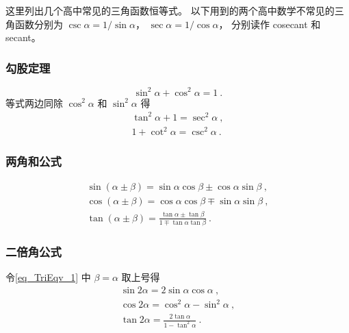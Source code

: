

这里列出几个高中常见的三角函数恒等式。 以下用到的两个高中数学不常见的三角函数分别为 $\csc \alpha= 1/\sin \alpha$， $\sec \alpha = 1/\cos \alpha$， 分别读作 cosecant 和 secant。

\subsubsection{勾股定理}
\begin{equation}
\sin^2 \alpha + \cos^2 \alpha = 1~.
\end{equation}
等式两边同除 $\cos^2 \alpha$ 和 $\sin^2 \alpha$ 得
\begin{gather}
\label{eq_TriEqv_13}
\tan^2 \alpha + 1 = \sec^2 \alpha~,\\
1 + \cot^2\alpha = \csc^2\alpha~.
\end{gather}

\subsubsection{两角和公式}
\begin{gather}\label{eq_TriEqv_1}
\sin(\alpha\pm \beta) = \sin \alpha\cos \beta \pm \cos \alpha\sin \beta~,\\
\label{eq_TriEqv_2}
\cos(\alpha\pm \beta) = \cos \alpha\cos \beta \mp \sin \alpha\sin \beta~,\\
\tan(\alpha\pm \beta) = \frac{\tan \alpha \pm \tan \beta}{1 \mp \tan \alpha \tan \beta}~.
\end{gather}

\subsubsection{二倍角公式}

令\autoref{eq_TriEqv_1} 中 $\beta=\alpha$ 取上号得
\begin{gather}
\sin 2\alpha = 2\sin \alpha\cos \alpha~,\\
\label{eq_TriEqv_4}
\cos 2\alpha = \cos^2 \alpha - \sin^2 \alpha~,\\
\tan 2\alpha = \frac{2\tan \alpha}{1 - \tan^2 \alpha}~.
\end{gather}

